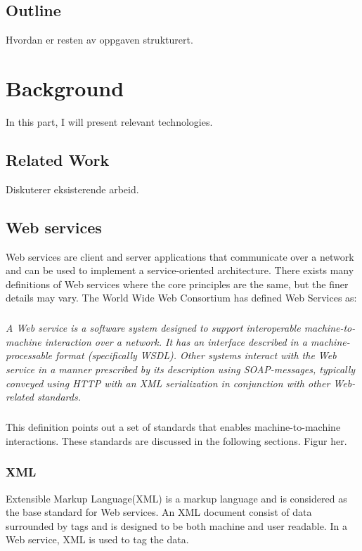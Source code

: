 \documentclass[USenglish]{ifimaster}
\begin{document}
\section{Outline}
Hvordan er resten av oppgaven strukturert.


\chapter{Background}
In this part, I will present relevant technologies.
\section{Related Work}
Diskuterer eksisterende arbeid.



\section{Web services}
\label{web-services}
Web services are client and server applications that communicate over a network
and can be used to implement a service-oriented architecture. There exists many
definitions of Web services where the core principles are the same, but the
finer details may vary. The World Wide Web Consortium has defined Web Services
as\cite{wrc-web-service}:
\paragraph{}
\textit{
    A Web service is a software system designed to support interoperable
    machine-to-machine interaction over a network. It has an interface described in
    a machine-processable format (specifically WSDL). Other systems interact with
    the Web service in a manner prescribed by its description using SOAP-messages,
    typically conveyed using HTTP with an XML serialization in conjunction with
    other Web-related standards.
}

\paragraph{}
This definition points out a set of standards that enables machine-to-machine
interactions. These standards are discussed in the following sections.
Figur her.

\subsection{XML}
Extensible Markup Language(XML) is a markup language and is considered as the base standard for Web services. An XML document consist of data surrounded by tags and is designed to be both machine and user readable. In a Web service, XML is used to tag the data.
\end{document}
